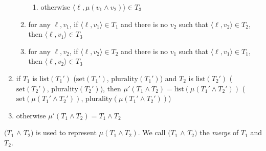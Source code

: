 \begin{enumerate}
\begin{enumerate}
\begin{enumerate}
\item otherwise $\langle\ell,\mu(v_1\wedge
  v_2)\rangle\in T_3$ 
 
\end{enumerate} 
  


 
\item for any $\ell,v_1$, if $\langle\ell,v_1\rangle\in T_1$ and there
  is no $v_2$ such that $\langle\ell,v_2\rangle\in T_2$, then
  $\langle\ell,v_1\rangle\in T_3$

\item for any $\ell,v_2$, if $\langle\ell,v_2\rangle\in T_2$ and there
  is no $v_1$ such that $\langle\ell,v_1\rangle\in T_1$, then
  $\langle\ell,v_2\rangle\in T_3$
 
\end{enumerate} 



\item if $T_1$ is $\mathrm{list}(T_1')$ ($\mathrm{set}(T_1')$, $\mathrm{plurality}(T_1')$) and
  $T_2$ is $\mathrm{list}(T_2')$ ($\mathrm{set}(T_2')$, $\mathrm{plurality}( T_2')$), then
  $\mu'(T_1\wedge T_2)=\mathrm{list}(\mu(T_1'\wedge T_2'))$ ($\mathrm{set}(\mu(T_1'\wedge
  T_2'))$, $\mathrm{plurality}(\mu(T_1'\wedge T_2'))$)
   
 
\item \label{item:mergeotherwise} otherwise $\mu'(T_1\wedge T_2)=T_1\wedge T_2$ 
 
\end{enumerate} 

$(T_1$ \d{$\wedge$} $T_2)$ is used to represent $\mu(T_1\wedge T_2)$.
We call  $(T_1$ \d{$\wedge$} $T_2)$ the \textit{merge} of $T_1$ and $T_2$.   

 
 
 


